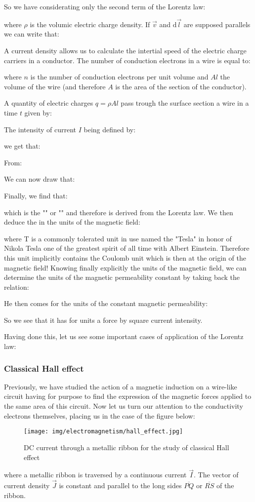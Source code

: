 	So we have considerating only the second term of the Lorentz law:
	
	where $\rho$ is the volumic electric charge density. If $\vec{v}$ and $\mathrm{d}\vec{l}$ are supposed parallels we can write that:
	
	A current density allows us to calculate the intertial speed of the electric charge carriers in a conductor. The number of conduction electrons in a wire is equal to:
	
	where $n$ is the number of conduction electrons per unit volume and $Al$ the volume of the wire (and therefore $A$ is the area of the section of the conductor).
	
	A quantity of electric charges $q=\rho A l$ pass trough the surface section a wire in a time $t$ given by:
	
	The intensity of current $I$ being defined by:
	
	we get that:
	
	From:
	
	We can now draw that:
	
	Finally, we find that:
	
	which is the "" or "" and therefore is derived from the Lorentz law. We then deduce the in the units of the magnetic field:
	
	where T is a commonly tolerated unit in use named the "Tesla" in honor of Nikola Tesla one of the greatest spirit of all time with Albert Einstein. Therefore this unit implicitly contains the Coulomb unit which is then at the origin of the magnetic field! Knowing finally explicitly the units of the magnetic field, we can determine the units of the magnetic permeability constant by taking back the relation:
	
	He then comes for the units of the constant magnetic permeability:
	
	So we see that it has for units a force by square current intensity.

	Having done this, let us see some important cases of application of the Lorentz law:
	
	\pagebreak
	\subsubsection{Classical Hall effect}
	Previously, we have studied the action of a magnetic induction on a wire-like circuit having for purpose to find the expression of the magnetic forces applied to the same area of this circuit. Now let us turn our attention to the conductivity electrons themselves, placing us in the case of the figure below:
	\begin{figure}[H]
		\centering
		\texttt{[image: img/electromagnetism/hall\_effect.jpg]}
		\caption{DC current through a metallic ribbon for the study of classical Hall effect}
	\end{figure}
	where a metallic ribbon is traversed by a continuous current $\vec{I}$. The vector of current density $\vec{J}$ is constant and parallel to the long sides $\overline{PQ}$ or $\overline{RS}$ of the ribbon.
	
